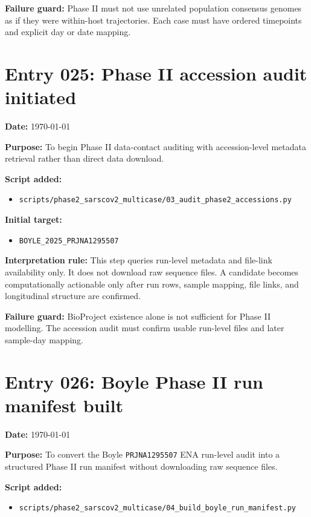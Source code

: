 \textbf{Failure guard:} Phase II must not use unrelated population consensus genomes as if they were within-host trajectories. Each case must have ordered timepoints and explicit day or date mapping.


\section*{Entry 025: Phase II accession audit initiated}

\textbf{Date:} \today

\textbf{Purpose:} To begin Phase II data-contact auditing with accession-level metadata retrieval rather than direct data download.

\textbf{Script added:}
\begin{itemize}
    \item \texttt{scripts/phase2\_sarscov2\_multicase/03\_audit\_phase2\_accessions.py}
\end{itemize}

\textbf{Initial target:}
\begin{itemize}
    \item \texttt{BOYLE\_2025\_PRJNA1295507}
\end{itemize}

\textbf{Interpretation rule:} This step queries run-level metadata and file-link availability only. It does not download raw sequence files. A candidate becomes computationally actionable only after run rows, sample mapping, file links, and longitudinal structure are confirmed.

\textbf{Failure guard:} BioProject existence alone is not sufficient for Phase II modelling. The accession audit must confirm usable run-level files and later sample-day mapping.


\section*{Entry 026: Boyle Phase II run manifest built}

\textbf{Date:} \today

\textbf{Purpose:} To convert the Boyle \texttt{PRJNA1295507} ENA run-level audit into a structured Phase II run manifest without downloading raw sequence files.

\textbf{Script added:}
\begin{itemize}
    \item \texttt{scripts/phase2\_sarscov2\_multicase/04\_build\_boyle\_run\_manifest.py}
\end{itemize}

